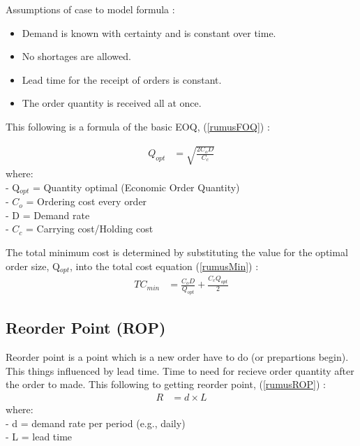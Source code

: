 \documentclass[12pt,a4paper,final]{iopart}
\begin{document}
Assumptions of case to model formula \cite{Rusell2011}: 
\begin{itemize}
	\item Demand is known with certainty and is constant over time.
	\item No shortages are allowed.
	\item Lead time for the receipt of orders is constant.
	\item The order quantity is received all at once.
\end{itemize}
This following is a formula of the basic EOQ, (\ref{rumusFOQ}) :

\begin{eqnarray}
	\label{rumusFOQ}
	Q_{opt} &= \sqrt{\frac{2C_oD}{C_c}}
\end{eqnarray}
where:\\
- Q$_{opt}$ = Quantity optimal (Economic Order Quantity)\\
- $C_o$ = Ordering cost every order\\
- D = Demand rate\\
- $C_c$ = Carrying cost/Holding cost

The total minimum cost is determined by substituting the value for the optimal order size, Q$_{opt}$, into the total cost equation (\ref{rumusMin}) :
\begin{eqnarray}
	\label{rumusMin}
	TC_{min} &= \frac{C_oD}{Q_{opt}} + \frac{C_cQ_{opt}}{2}
\end{eqnarray}

\subsection{Reorder Point (ROP)}
Reorder point is a point which is a new order have to do (or prepartions begin). This things influenced by lead time. Time to need for recieve order quantity after the order to made. This following to getting reorder point, (\ref{rumusROP}) \cite{Rusell2011}:
\begin{eqnarray}
	\label{rumusROP}
	R &= d \times L
\end{eqnarray}
where:\\
- d = demand rate per period (e.g., daily)\\
- L = lead time
\end{document}
